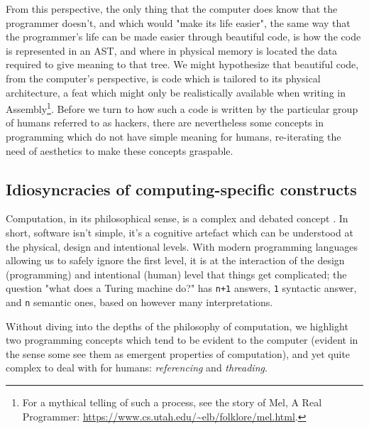 From this perspective, the only thing that the computer does know that the programmer doesn't, and which would "make its life easier", the same way that the programmer's life can be made easier through beautiful code, is how the code is represented in an AST, and where in physical memory is located the data required to give meaning to that tree\citep{stansifer_study_1994}. We might hypothesize that beautiful code, from the computer's perspective, is code which is tailored to its physical architecture, a feat which might only be realistically available when writing in Assembly\footnote{For a mythical telling of such a process, see the story of Mel, A Real Programmer: \url{https://www.cs.utah.edu/~elb/folklore/mel.html}.}. Before we turn to how such a code is written by the particular group of humans referred to as hackers, there are nevertheless some concepts in programming which do not have simple meaning for humans, re-iterating the need of aesthetics to make these concepts graspable.

\subsection{Idiosyncracies of computing-specific constructs}
\label{subsec:idiosyncracies-computer-constructs}

Computation, in its philosophical sense, is a complex and debated concept \citep{rapaport_philosophy_2005,smith_origin_1998}. In short, software isn't simple, it's a cognitive artefact which can be understood at the physical, design and intentional levels\citep{moor_three_1978}. With modern programming languages allowing us to safely ignore the first level, it is at the interaction of the design (programming) and intentional (human) level that things get complicated; the question "what does a Turing machine do?" has \lstinline{n+1} answers, \lstinline{1} syntactic answer, and \lstinline{n} semantic ones, based on however many interpretations.

Without diving into the depths of the philosophy of computation, we highlight two programming concepts which tend to be evident to the computer (evident in the sense some see them as emergent properties of computation), and yet quite complex to deal with for humans: \emph{referencing} and \emph{threading}.


